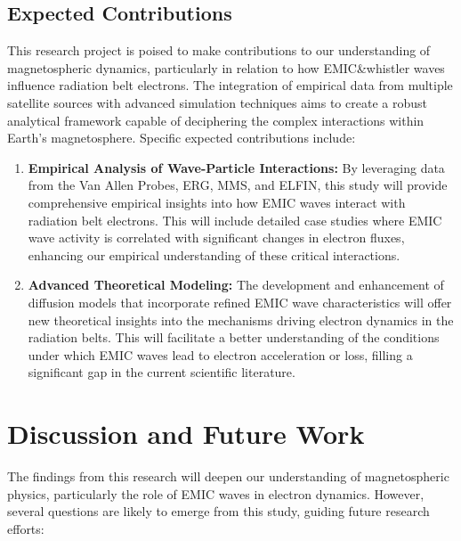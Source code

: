 \documentclass[
  letterpaper,
  DIV=11,
  numbers=noendperiod]{scrartcl}
\begin{document}
\subsection{Expected Contributions}\label{expected-contributions}

This research project is poised to make contributions to our understanding of magnetospheric dynamics, particularly in relation to how EMIC\&whistler waves influence radiation belt electrons. The integration of empirical data from multiple satellite sources with advanced simulation techniques aims to create a robust analytical framework capable of deciphering the complex interactions within Earth's magnetosphere. Specific expected contributions include:

\begin{enumerate}
\def\labelenumi{\arabic{enumi}.}
\item
  \textbf{Empirical Analysis of Wave-Particle Interactions:} By leveraging data from the Van Allen Probes, ERG, MMS, and ELFIN, this study will provide comprehensive empirical insights into how EMIC waves interact with radiation belt electrons. This will include detailed case studies where EMIC wave activity is correlated with significant changes in electron fluxes, enhancing our empirical understanding of these critical interactions.
\item
  \textbf{Advanced Theoretical Modeling:} The development and enhancement of diffusion models that incorporate refined EMIC wave characteristics will offer new theoretical insights into the mechanisms driving electron dynamics in the radiation belts. This will facilitate a better understanding of the conditions under which EMIC waves lead to electron acceleration or loss, filling a significant gap in the current scientific literature.
\end{enumerate}

\section{Discussion and Future Work}\label{discussion-and-future-work}

The findings from this research will deepen our understanding of magnetospheric physics, particularly the role of EMIC waves in electron dynamics. However, several questions are likely to emerge from this study, guiding future research efforts:
\end{document}
